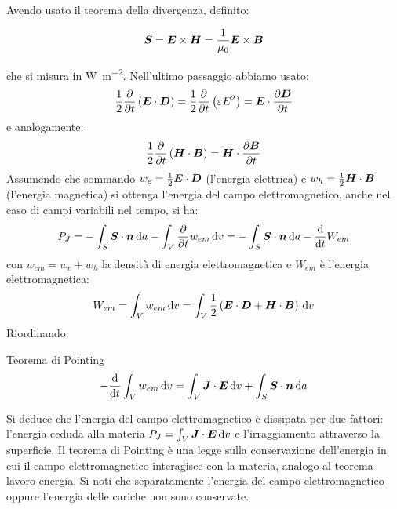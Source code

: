 Avendo usato il teorema della divergenza, definito:
\begin{Def}
  \begin{equation}
    \boldsymbol{S}=\boldsymbol{E}\times\boldsymbol{H} = \frac{1}{\mu_0}\boldsymbol{E}\times\boldsymbol{B}
  \end{equation}
\end{Def}
che si misura in \si{\watt\per\meter\squared}. Nell'ultimo passaggio abbiamo usato:
\begin{equation}
  \frac{1}{2}\frac{\partial}{\partial t}\left(\boldsymbol{E}\cdot\boldsymbol{D}\right)=\frac{1}{2}\frac{\partial}{\partial t}\left(\varepsilon E^2\right)=\boldsymbol{E}\cdot\frac{\partial\boldsymbol{D}}{\partial t}
\end{equation}
e analogamente:
\begin{equation}
  \frac{1}{2}\frac{\partial}{\partial t}\left(\boldsymbol{H}\cdot\boldsymbol{B}\right)=\boldsymbol{H}\cdot\frac{\partial\boldsymbol{B}}{\partial t}
\end{equation}
Assumendo che sommando $w_e=\frac{1}{2}\boldsymbol{E}\cdot\boldsymbol{D}$ (l'energia elettrica) e $w_h=\frac{1}{2}\boldsymbol{H}\cdot\boldsymbol{B}$ (l'energia magnetica) si ottenga l'energia del campo elettromagnetico, anche nel caso di campi variabili nel tempo, si ha:
\begin{equation}
  P_J=-\int_S\boldsymbol{S}\cdot\boldsymbol{n}\,\mathrm{d} a-\int_V\frac{\partial}{\partial t}{w_{em}}\,\mathrm{d} v=-\int_S\boldsymbol{S}\cdot\boldsymbol{n}\,\mathrm{d} a-\frac{\mathrm{d}}{\mathrm{d} t}{W_{em}}
\end{equation}
con $w_{em}=w_e+w_h$ la densità di energia elettromagnetica e $W_{em}$ è l'energia elettromagnetica:
\begin{equation}
  W_{em} = \int_V w_{em}\,\mathrm{d} v = \int_V \frac{1}{2}\left(\boldsymbol{E}\cdot\boldsymbol{D}+\boldsymbol{H}\cdot\boldsymbol{B}\right)\,\mathrm{d} v
\end{equation}
Riordinando:
\begin{Teo}{Teorema di Pointing}
  \begin{equation}
    -\frac{\mathrm{d}}{\mathrm{d} t}\int_V w_{em}\,\mathrm{d} v = \int_V \boldsymbol{J} \cdot \boldsymbol{E}\,\mathrm{d} v+\int_S\boldsymbol{S}\cdot\boldsymbol{n}\,\mathrm{d} a
  \end{equation}
\end{Teo}
Si deduce che l'energia del campo elettromagnetico è dissipata per due fattori: l'energia ceduda alla materia $P_J=\int_V \boldsymbol{J}\cdot\boldsymbol{E}\,\mathrm{d} v$ e l'irraggiamento attraverso la superficie. Il teorema di Pointing è una legge sulla conservazione dell'energia in cui il campo elettromagnetico interagisce con la materia, analogo al teorema lavoro-energia. Si noti che separatamente l'energia del campo elettromagnetico oppure l'energia delle cariche non sono conservate.

